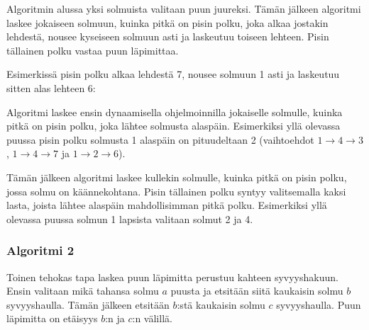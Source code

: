 Algoritmin alussa
yksi solmuista valitaan puun juureksi.
Tämän jälkeen algoritmi laskee
jokaiseen solmuun,
kuinka pitkä on pisin polku,
joka alkaa jostakin lehdestä,
nousee kyseiseen solmuun asti
ja laskeutuu toiseen lehteen.
Pisin tällainen polku vastaa puun läpimittaa.

Esimerkissä pisin polku alkaa lehdestä 7,
nousee solmuun 1 asti ja laskeutuu
sitten alas lehteen 6:
\begin{center}
\end{center}

Algoritmi laskee ensin dynaamisella ohjelmoinnilla
jokaiselle solmulle, kuinka pitkä on pisin polku,
joka lähtee solmusta alaspäin.
Esimerkiksi yllä olevassa puussa pisin polku
solmusta 1 alaspäin on pituudeltaan 2
(vaihtoehdot $1 \rightarrow 4 \rightarrow 3$,
$1 \rightarrow 4 \rightarrow 7$ ja $1 \rightarrow 2 \rightarrow 6$).

Tämän jälkeen algoritmi laskee kullekin solmulle,
kuinka pitkä on pisin polku, jossa solmu on käännekohtana.
Pisin tällainen polku syntyy valitsemalla kaksi lasta,
joista lähtee alaspäin mahdollisimman pitkä polku.
Esimerkiksi yllä olevassa puussa solmun 1 lapsista valitaan solmut 2 ja 4.

\subsubsection{Algoritmi 2}

Toinen tehokas tapa laskea puun läpimitta 
perustuu kahteen syvyyshakuun.
Ensin valitaan mikä tahansa solmu $a$ puusta
ja etsitään siitä kaukaisin solmu $b$
syvyyshaulla.
Tämän jälkeen etsitään $b$:stä kaukaisin
solmu $c$ syvyyshaulla.
Puun läpimitta on etäisyys $b$:n ja $c$:n välillä.

